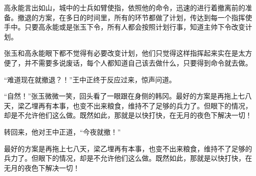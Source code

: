 高永能言出如山，城中的士兵如臂使指，依照他的命令，迅速的进行着撤离前的准备。撤退的方案，在多日的时间里，所有的环节都做了计划，传达到每一个指挥使手中。只要高永能或是张玉下令，所有人都会按照计划行事，知道主帅下令改变计划。

张玉和高永能眼下都不觉得有必要改变计划，他们只觉得这样指挥起来实在是太方便了，并不需要多说废话，每个人都知道自己该去做什么，只要得到命令就去做。

“难道现在就撤退？！”王中正终于反应过来，惊声问道。

“自然！”张玉微微一笑，回头看了一眼跟在身侧的韩冈。最好的方案是再拖上七八天，梁乙埋再有本事，也变不出来粮食，维持不了足够的兵力了。但眼下的情况，却是不允许他们这么做。既然如此，那就是以快打快，在无月的夜色下解决一切！

转回来，他对王中正道，“今夜就撤！”

最好的方案是再拖上七八天，梁乙埋再有本事，也变不出来粮食，维持不了足够的兵力了。但眼下的情况，却是不允许他们这么做。既然如此，那就是以快打快，在无月的夜色下解决一切！

